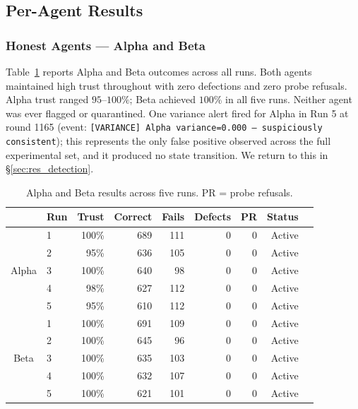 \subsection{Per-Agent Results}
\label{sec:res_agents}

\subsubsection{Honest Agents — Alpha and Beta}

Table~\ref{tab:alpha_beta} reports Alpha and Beta outcomes across all runs.  Both agents
maintained high trust throughout with zero defections and zero probe refusals.  Alpha
trust ranged $95$--$100\%$; Beta achieved $100\%$ in all five runs.  Neither agent was
ever flagged or quarantined.  One variance alert fired for Alpha in Run 5 at round 1165
(event: \texttt{[VARIANCE] Alpha variance=0.000 --- suspiciously consistent}); this
represents the only false positive observed across the full experimental set, and it
produced no state transition.  We return to this in \S\ref{sec:res_detection}.

\begin{table}[h]
\centering
\caption{Alpha and Beta results across five runs. PR = probe refusals.}
\label{tab:alpha_beta}
\begin{tabular}{clrrrrrrr}
\hline
 & \textbf{Run} & \textbf{Trust} & \textbf{Correct} & \textbf{Fails} &
\textbf{Defects} & \textbf{PR} & \textbf{Status} \\
\hline
\multirow{5}{*}{Alpha}
 & 1 & 100\% & 689 & 111 & 0 & 0 & Active \\
 & 2 &  95\% & 636 & 105 & 0 & 0 & Active \\
 & 3 & 100\% & 640 &  98 & 0 & 0 & Active \\
 & 4 &  98\% & 627 & 112 & 0 & 0 & Active \\
 & 5 &  95\% & 610 & 112 & 0 & 0 & Active \\
\hline
\multirow{5}{*}{Beta}
 & 1 & 100\% & 691 & 109 & 0 & 0 & Active \\
 & 2 & 100\% & 645 &  96 & 0 & 0 & Active \\
 & 3 & 100\% & 635 & 103 & 0 & 0 & Active \\
 & 4 & 100\% & 632 & 107 & 0 & 0 & Active \\
 & 5 & 100\% & 621 & 101 & 0 & 0 & Active \\
\hline
\end{tabular}
\end{table}

